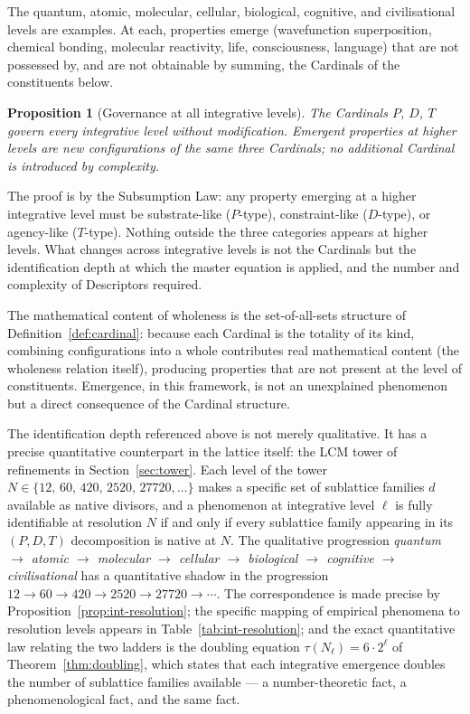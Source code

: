\documentclass[11pt,a4paper]{article}
\newtheorem{proposition}[theorem]{Proposition}
\theoremstyle{definition}
\theoremstyle{remark}
\begin{document}
The quantum, atomic, molecular, cellular, biological, cognitive, and civilisational levels are examples. At each, properties emerge (wavefunction superposition, chemical bonding, molecular reactivity, life, consciousness, language) that are not possessed by, and are not obtainable by summing, the Cardinals of the constituents below.

\begin{proposition}[Governance at all integrative levels]\label{prop:governance}
The Cardinals $P$, $D$, $T$ govern every integrative level without modification. Emergent properties at higher levels are new configurations of the same three Cardinals; no additional Cardinal is introduced by complexity.
\end{proposition}

The proof is by the Subsumption Law: any property emerging at a higher integrative level must be substrate-like ($P$-type), constraint-like ($D$-type), or agency-like ($T$-type). Nothing outside the three categories appears at higher levels. What changes across integrative levels is not the Cardinals but the identification depth at which the master equation is applied, and the number and complexity of Descriptors required.

The mathematical content of wholeness is the set-of-all-sets structure of Definition~\ref{def:cardinal}: because each Cardinal is the totality of its kind, combining configurations into a whole contributes real mathematical content (the wholeness relation itself), producing properties that are not present at the level of constituents. Emergence, in this framework, is not an unexplained phenomenon but a direct consequence of the Cardinal structure.

The identification depth referenced above is not merely qualitative. It has a precise quantitative counterpart in the lattice itself: the LCM tower of refinements in Section~\ref{sec:tower}. Each level of the tower $N \in \{12,\,60,\,420,\,2520,\,27720,\ldots\}$ makes a specific set of sublattice families $d$ available as native divisors, and a phenomenon at integrative level $\ell$ is fully identifiable at resolution $N$ if and only if every sublattice family appearing in its $(P,D,T)$ decomposition is native at $N$. The qualitative progression \emph{quantum $\to$ atomic $\to$ molecular $\to$ cellular $\to$ biological $\to$ cognitive $\to$ civilisational} has a quantitative shadow in the progression $12 \to 60 \to 420 \to 2520 \to 27720 \to \cdots$. The correspondence is made precise by Proposition~\ref{prop:int-resolution}; the specific mapping of empirical phenomena to resolution levels appears in Table~\ref{tab:int-resolution}; and the exact quantitative law relating the two ladders is the doubling equation $\tau(N_{\ell}) = 6\cdot 2^{\ell}$ of Theorem~\ref{thm:doubling}, which states that each integrative emergence doubles the number of sublattice families available --- a number-theoretic fact, a phenomenological fact, and the same fact.
\end{document}
